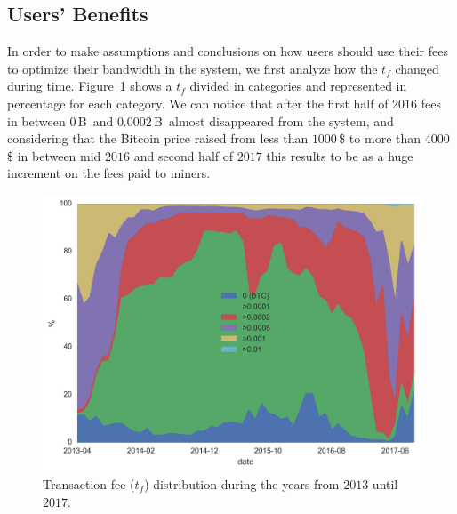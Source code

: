 \documentclass[USenglish]{uit-thesis}
\def\bitcoin{\leavevmode\rlap{\hskip.5pt-}B}
\begin{document}
\subsection{Users' Benefits}
\label{sec:userbenefits}
In order to make assumptions and conclusions on how
users should use their fees to optimize their bandwidth in
the system, we first analyze how the $t_f$ changed during
time. Figure~\ref{fig:txs_fee_distribution} shows a $t_f$
divided in categories and represented in percentage for each
category. We can notice that after the first half of $2016$
fees in between $0$\,\bitcoin~and $0.0002$\,\bitcoin~almost disappeared
from the system, and considering that the Bitcoin price raised
from less than $1000$\,\$ to more than $4000$\,\$ in between
mid $2016$ and second half of $2017$ this results to be
as a huge increment on the fees paid to miners.
\begin{figure}[h]
	\centering
	\includegraphics[width=1\textwidth]{img/txs_fee_distribution}
	\caption{Transaction fee ($t_f$) distribution during the years from
		$2013$ until $2017$.}
	\label{fig:txs_fee_distribution}
\end{figure}
\end{document}
